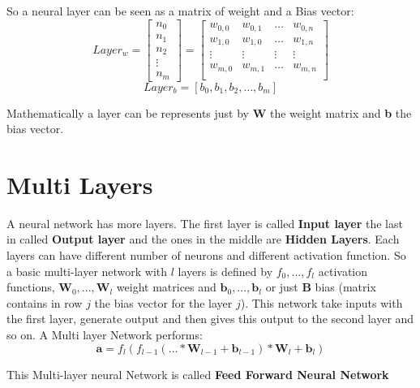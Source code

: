 \documentclass[12pt,a4paper,twoside,openright]{scrbook}
\begin{document}
So a neural layer can be seen as a matrix of weight and a Bias vector:
\begin{equation}
Layer_w = \begin{bmatrix}
n_0 \\ n_1\\ n_2\\ \vdots \\ n_m
\end{bmatrix} = \begin{bmatrix}
w_{0,0} & w_{0,1} & \ldots & w_{0,n} \\
w_{1,0} & w_{1,0} & \ldots & w_{1,n} \\
\vdots & \vdots & \vdots & \vdots \\
w_{m,0} & w_{m,1} & \ldots & w_{m,n} \\
\end{bmatrix}
\end{equation}
\begin{equation}
Layer_b = [b_0, b_1, b_2, \ldots , b_m]
\end{equation}

Mathematically a layer can be represents just by \textbf{W} the weight matrix and \textbf{b} the bias vector.

\section{Multi Layers}

A neural network has more layers. The first layer is called \textbf{Input layer} the last in called \textbf{Output layer} and the ones in the middle are \textbf{Hidden Layers}. 
Each layers can have different number of neurons and different activation function. So a basic multi-layer network with $l$ layers is defined by $f_0, ..., f_l$ activation functions, $\textbf{W}_0,..., \textbf{W}_l$ weight matrices and $\textbf{b}_0,...,\textbf{b}_l$ or just \textbf{B} bias (matrix contains in row $j$ the bias vector for the layer $j$).
This network take inputs with the first layer, generate output and then gives this output to the second layer and so on.
A Multi layer Network performs:
\begin{equation}
\textbf{a} = f_l(f_{l-1}(\ldots * \textbf{W}_{l-1} + \textbf{b}_{l-1}) * \textbf{W}_{l} + \textbf{b}_{l})
\end{equation}

This Multi-layer neural Network is called \textbf{Feed Forward Neural Network}
\end{document}
